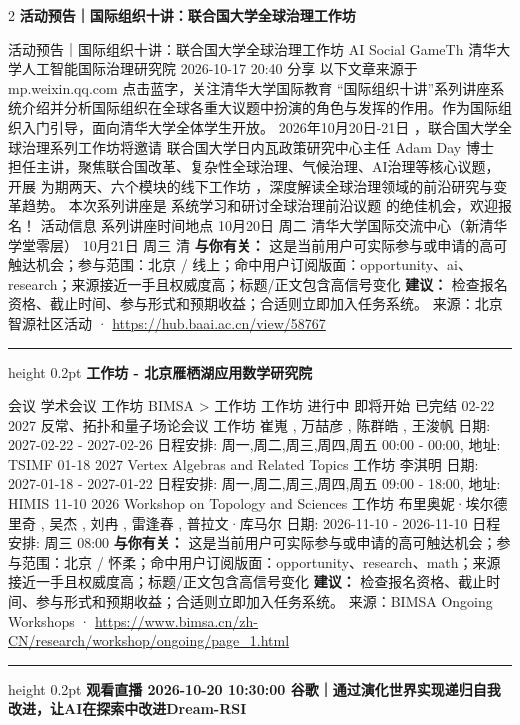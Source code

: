 \documentclass[10.5pt]{ctexart}
\begin{document}
\begin{multicols}{2}
{\large\bfseries 活动预告｜国际组织十讲：联合国大学全球治理工作坊}\par
活动预告｜国际组织十讲：联合国大学全球治理工作坊 AI Social GameTh 清华大学人工智能国际治理研究院 2026-10-17 20:40 分享 以下文章来源于mp.weixin.qq.com 点击蓝字，关注清华大学国际教育 “国际组织十讲”系列讲座系统介绍并分析国际组织在全球各重大议题中扮演的角色与发挥的作用。作为国际组织入门引导，面向清华大学全体学生开放。 2026年10月20日-21日 ，联合国大学全球治理系列工作坊将邀请 联合国大学日内瓦政策研究中心主任 Adam Day 博士 担任主讲，聚焦联合国改革、复杂性全球治理、气候治理、AI治理等核心议题，开展 为期两天、六个模块的线下工作坊 ，深度解读全球治理领域的前沿研究与变革趋势。 本次系列讲座是 系统学习和研讨全球治理前沿议题 的绝佳机会，欢迎报名！ 活动信息 系列讲座时间地点 10月20日 周二 清华大学国际交流中心（新清华学堂零层） 10月21日 周三 清
\textbf{与你有关：} 这是当前用户可实际参与或申请的高可触达机会；参与范围：北京 / 线上；命中用户订阅版面：opportunity、ai、research；来源接近一手且权威度高；标题/正文包含高信号变化
\textbf{建议：} 检查报名资格、截止时间、参与形式和预期收益；合适则立即加入任务系统。
{\footnotesize\color{ormuted} 来源：北京智源社区活动 · \url{https://hub.baai.ac.cn/view/58767}}
\vspace{2mm}
\hrule height 0.2pt
\vspace{2mm}
{\large\bfseries 工作坊 - 北京雁栖湖应用数学研究院}\par
会议 学术会议 工作坊 BIMSA > 工作坊 工作坊 进行中 即将开始 已完结 02-22 2027 反常、拓扑和量子场论会议 工作坊 崔嵬 , 万喆彦 , 陈群皓 , 王浚帆 日期: 2027-02-22 - 2027-02-26 日程安排: 周一,周二,周三,周四,周五 00:00 - 00:00, 地址: TSIMF 01-18 2027 Vertex Algebras and Related Topics 工作坊 李淇明 日期: 2027-01-18 - 2027-01-22 日程安排: 周一,周二,周三,周四,周五 09:00 - 18:00, 地址: HIMIS 11-10 2026 Workshop on Topology and Sciences 工作坊 布里奥妮·埃尔德里奇 , 吴杰 , 刘冉 , 雷逢春 , 普拉文·库马尔 日期: 2026-11-10 - 2026-11-10 日程安排: 周三 08:00
\textbf{与你有关：} 这是当前用户可实际参与或申请的高可触达机会；参与范围：北京 / 怀柔；命中用户订阅版面：opportunity、research、math；来源接近一手且权威度高；标题/正文包含高信号变化
\textbf{建议：} 检查报名资格、截止时间、参与形式和预期收益；合适则立即加入任务系统。
{\footnotesize\color{ormuted} 来源：BIMSA Ongoing Workshops · \url{https://www.bimsa.cn/zh-CN/research/workshop/ongoing/page_1.html}}
\vspace{2mm}
\hrule height 0.2pt
\vspace{2mm}
{\large\bfseries 观看直播 2026-10-20 10:30:00 谷歌｜通过演化世界实现递归自我改进，让AI在探索中改进Dream-RSI}\par

\end{multicols}
\end{document}
